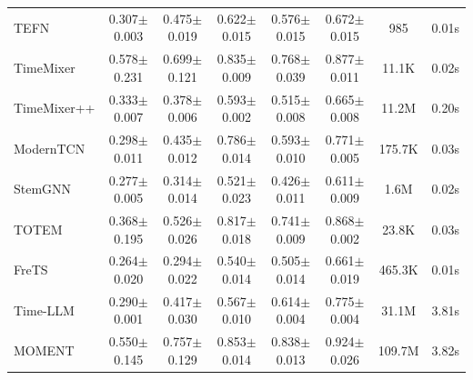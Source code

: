 \begin{table}[h]
\begin{footnotesize}
\begin{tabular}{l|ccccc|cc}
        TEFN & 0.307$\pm$0.003 & 0.475$\pm$0.019 & 0.622$\pm$0.015 & 0.576$\pm$0.015 & 0.672$\pm$0.015 & 985 & 0.01s \\
        TimeMixer & 0.578$\pm$0.231 & 0.699$\pm$0.121 & 0.835$\pm$0.009 & 0.768$\pm$0.039 & 0.877$\pm$0.011 & 11.1K & 0.02s \\
        TimeMixer++ & 0.333$\pm$0.007 & 0.378$\pm$0.006 & 0.593$\pm$0.002 & 0.515$\pm$0.008 & 0.665$\pm$0.008 & 11.2M & 0.20s \\
        ModernTCN & 0.298$\pm$0.011 & 0.435$\pm$0.012 & 0.786$\pm$0.014 & 0.593$\pm$0.010 & 0.771$\pm$0.005 & 175.7K & 0.03s \\
        StemGNN & 0.277$\pm$0.005 & 0.314$\pm$0.014 & 0.521$\pm$0.023 & 0.426$\pm$0.011 & 0.611$\pm$0.009 & 1.6M & 0.02s \\
        TOTEM & 0.368$\pm$0.195 & 0.526$\pm$0.026 & 0.817$\pm$0.018 & 0.741$\pm$0.009 & 0.868$\pm$0.002 & 23.8K & 0.03s \\
        FreTS & 0.264$\pm$0.020 & 0.294$\pm$0.022 & 0.540$\pm$0.014 & 0.505$\pm$0.014 & 0.661$\pm$0.019 & 465.3K & 0.01s \\
        Time-LLM & 0.290$\pm$0.001 & 0.417$\pm$0.030 & 0.567$\pm$0.010 & 0.614$\pm$0.004 & 0.775$\pm$0.004 & 31.1M & 3.81s \\
        MOMENT & 0.550$\pm$0.145 & 0.757$\pm$0.129 & 0.853$\pm$0.014 & 0.838$\pm$0.013 & 0.924$\pm$0.026 & 109.7M & 3.82s \\
        \bottomrule
    \end{tabular}
    \end{footnotesize}
\end{table}